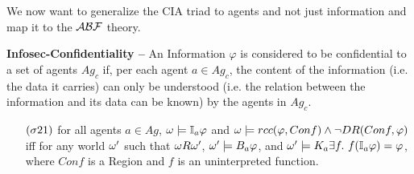 We now want to generalize the CIA triad to agents and not just 
information and map it to the $\mathcal{A}\mathcal{B}\mathcal{F}$ theory.
\begin{definition}{\bf Infosec-Confidentiality --}\label{def:infosec-c}
	An Information $\varphi$ is considered to be confidential to a set of 
	agents $Ag_c$ if, per each agent $a\in Ag_c$, the content of the
	information (i.e. the data it carries) can only be understood (i.e. the relation
	between the information and its data can be known) by the
	agents in $Ag_c$.

	\begin{itemize}
		\item[$(\sigma21)$] for all agents $a\in Ag$,
			$\omega\models\mathbb{I}_{a}{\varphi}$ and
			$\omega\models rcc(\varphi,Conf) \wedge
			\neg DR(Conf,\varphi)$ iff for any world $\omega'$
			such that $\omega R\omega'$,
			$\omega'\models B_{a}\varphi$, and
			$\omega'\models K_{a}\exists f.~
			f(\mathbb{I}_{a}{\varphi})=\varphi$, where 
			$Conf$ is a Region and $f$ is an uninterpreted function.
	\end{itemize}
\end{definition}

